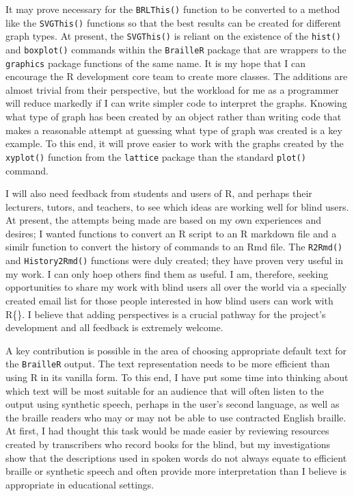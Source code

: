 \documentclass[
]{book}
\begin{document}
It may prove necessary for the \texttt{BRLThis()} function to be converted to a method like the \texttt{SVGThis()} functions so that the best results can be created for different graph types. At present, the \texttt{SVGThis()} is reliant on the existence of the \texttt{hist()} and \texttt{boxplot()} commands within the \texttt{BrailleR} package that are wrappers to the \texttt{graphics} package functions of the same name.
It is my hope that I can encourage the R development core team to create more classes. The additions are almost trivial from their perspective, but the workload for me as a programmer will reduce markedly if I can write simpler code to interpret the graphs. Knowing what type of graph has been created by an object rather than writing code that makes a reasonable attempt at guessing what type of graph was created is a key example. To this end, it will prove easier to work with the graphs created by the \texttt{xyplot()} function from the \texttt{lattice} package than the standard \texttt{plot()} command.

I will also need feedback from students and users of R, and perhaps their lecturers, tutors, and teachers, to see which ideas are working well for blind users. At present, the attempts being made are based on my own experiences and desires; I wanted functions to convert an R script to an R markdown file and a similr function to convert the history of commands to an Rmd file. The \texttt{R2Rmd()} and \texttt{History2Rmd()} functions were duly created; they have proven very useful in my work. I can only hoep others find them as useful. I am, therefore, seeking opportunities to share my work with blind users all over the world via a specially created email list for those people interested in how blind users can work with R\{\}. I believe that
adding perspectives is a crucial pathway for the project's development and all feedback is extremely welcome.

A key contribution is possible in the area of choosing appropriate default text for the \texttt{BrailleR} output. The text representation needs to be more efficient than using R in its vanilla form. To this end, I have put some time into thinking about which text will be most suitable for an audience that will often listen to the output using synthetic speech, perhaps in the user's second language, as well as the braille readers who may or may not be able to use contracted English braille. At first, I had thought this task would be made easier by reviewing resources created by transcribers who record books for the blind, but my investigations show that the descriptions used in spoken words do not always equate to efficient braille or synthetic speech and often provide more interpretation than I believe is appropriate in educational settings.
\end{document}

